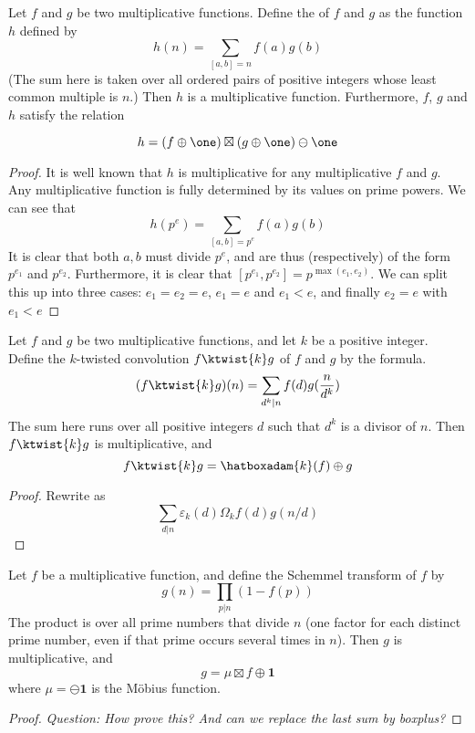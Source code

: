 \documentclass[a4paper]{article}
\begin{document}
\begin{propdef}
Let $f$ and $g$ be two multiplicative functions. Define the  of $f$ and $g$ as the function $h$ defined by
$$ h(n) = \sum_{[a,b] = n} f(a) g(b)   $$
(The sum here is taken over all ordered pairs of positive integers whose least common multiple is $n$.) Then $h$ is a multiplicative function. Furthermore, $f$, $g$ and $h$ satisfy the relation

$$  h = (f \oplus \one) \boxtimes (g \oplus \one) \ominus \one   $$

\end{propdef}

\begin{proof}
It is well known that $h$ is multiplicative for any multiplicative $f$ and $g$. Any multiplicative function is fully determined by its values on prime powers. We can see that
$$h(p^e) = \sum_{[a, b] = p^e} f(a)g(b)$$
It is clear that both $a, b$ must divide $p^e$, and are thus (respectively) of the form $p^{e_1}$ and $p^{e_2}$. Furthermore, it is clear that $[p^{e_1}, p^{e_2}] = p^{\max(e_1, e_2)}$. We can split this up into three cases: $e_1 = e_2 = e$, $e_1 = e$ and $e_1 < e$, and finally $e_2 = e$ with $e_1 < e$
\end{proof}


\begin{propdef}
Let $f$ and $g$ be two multiplicative functions, and let $k$ be a positive integer. Define the $k$-twisted convolution $f \ktwist{k} g$  of $f$ and $g$ by the formula.
$$  (f \ktwist{k} g) (n) = \sum_{d^k \vert n} f(d) g(\frac{n}{d^k})   $$
The sum here runs over all positive integers $d$ such that $d^k$ is a divisor of $n$. Then $f \ktwist{k} g$ is multiplicative, and 
$$  f \ktwist{k} g =  \hatboxadam{k}(f) \oplus g  $$
\end{propdef}
\begin{proof}
Rewrite as 
$$  \sum_{d \vert n} \varepsilon_k(d) \Omega_k f(d) g(n/d)  $$
\end{proof}

\begin{propdef}
Let $f$ be a multiplicative function, and define the Schemmel transform of $f$ by
$$ g(n) = \prod_{p \vert n} (1-f(p))   $$
The product is over all prime numbers that divide $n$ (one factor for each distinct prime number, even if that prime occurs several times in $n$). Then $g$ is multiplicative, and 
$$  g = \mu \boxtimes f \oplus \mathbf{1}    $$
where $\mu = \ominus \mathbf{1}$ is the M{\"o}bius function.
\end{propdef}
\begin{proof}
\emph{Question: How prove this? And can we replace the last sum by boxplus?}
\end{proof}
\end{document}
